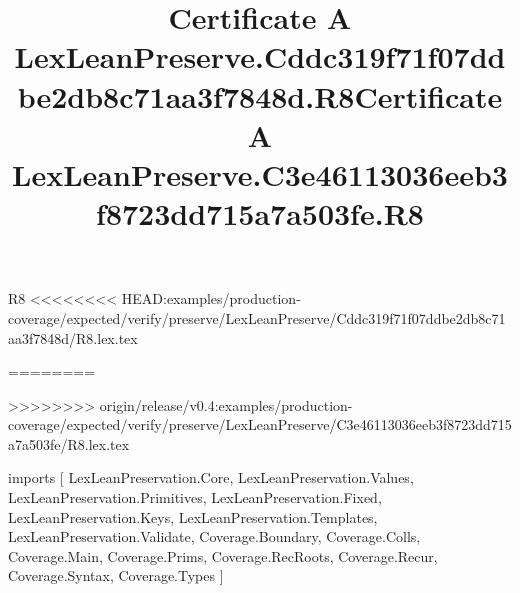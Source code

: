 \begin{lexlean}{R8}
<<<<<<<< HEAD:examples/production-coverage/expected/verify/preserve/LexLeanPreserve/Cddc319f71f07ddbe2db8c71aa3f7848d/R8.lex.tex
\title{Certificate A LexLeanPreserve.Cddc319f71f07ddbe2db8c71aa3f7848d.R8}
========
\title{Certificate A LexLeanPreserve.C3e46113036eeb3f8723dd715a7a503fe.R8}
>>>>>>>> origin/release/v0.4:examples/production-coverage/expected/verify/preserve/LexLeanPreserve/C3e46113036eeb3f8723dd715a7a503fe/R8.lex.tex
\begin{coremodule}
imports [
  LexLeanPreservation.Core,
  LexLeanPreservation.Values,
  LexLeanPreservation.Primitives,
  LexLeanPreservation.Fixed,
  LexLeanPreservation.Keys,
  LexLeanPreservation.Templates,
  LexLeanPreservation.Validate,
  Coverage.Boundary,
  Coverage.Colls,
  Coverage.Main,
  Coverage.Prims,
  Coverage.RecRoots,
  Coverage.Recur,
  Coverage.Syntax,
  Coverage.Types
]


\end{coremodule}
\end{lexlean}
